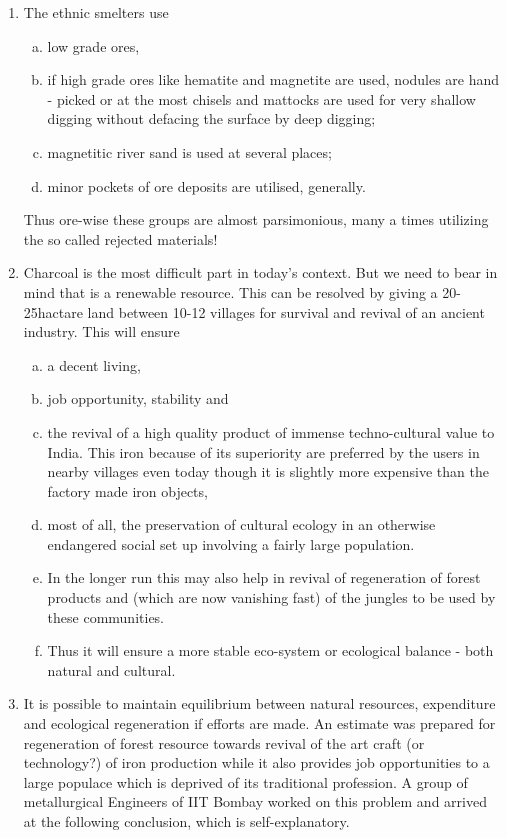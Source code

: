 \begin{enumerate}[1)]
\item The ethnic smelters use 
\begin{enumerate}[(a)]
\item low grade ores, 
\item if high grade ores like hematite and magnetite are used, nodules are hand - picked or at the most chisels and mattocks are used for very shallow digging without defacing the surface by deep digging; 
\item magnetitic river sand is used at several places; 
\item minor pockets of ore deposits are utilised, generally. 
\end{enumerate}
Thus ore-wise these groups are almost parsimonious, many a times utilizing the so called rejected materials!
\item Charcoal is the most difficult part in today's context. But we need to bear in mind that is a renewable resource. This can be resolved by giving a 20-25hactare land between 10-12 villages for survival and revival of an ancient industry. This will ensure 
\begin{enumerate}[(a)]
\item a decent living, 
\item job opportunity, stability and 
\item the revival of a high quality product of immense techno-cultural value to India. This iron because of its superiority are preferred by the users in nearby villages even today though it is slightly more expensive than the factory made iron objects, 
\item most of all, the preservation of cultural ecology in an otherwise endangered social set up involving a fairly large population. 
\item In the longer run this may also help in revival of regeneration of forest products and (which are now vanishing fast) of the jungles to be used by these communities. 
\item Thus it will ensure a more stable eco-system or ecological balance - both natural and cultural.
\end{enumerate}
\item It is possible to maintain equilibrium between natural resources, expenditure and ecological regeneration if efforts are made. An estimate was prepared for regeneration of forest resource towards revival of the art craft (or technology?) of iron production while it also provides job opportunities to a large populace which is deprived of its traditional profession. A group of metallurgical Engineers of IIT Bombay worked on this problem and arrived at the following conclusion, which is self-explanatory.
\end{enumerate}

